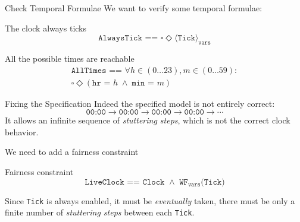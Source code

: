 \begin{frame}{Check Temporal Formulae}
    We want to verify some temporal formulae:
    \pause
    \begin{block}{The clock always ticks}
        \[
            \texttt{AlwaysTick == } \square \Diamond \langle \texttt{Tick} \rangle _{\texttt{vars}}
        \]
    \end{block}
    \pause
    \begin{block}{All the possible times are reachable}
        \begin{equation*}
            \begin{gathered}
                \texttt{AllTimes == } \forall h \in (0 \ldots 23), m \in (0 \ldots 59):\\
                \square \Diamond (\texttt{hr = } h\; \land\; \texttt{min = } m)
            \end{gathered}
        \end{equation*}
    \end{block}
    \demo
\end{frame}

\begin{frame}{Fixing the Specification}
    Indeed the specified model is not entirely correct:
    \[
        \texttt{00:00} \rightarrow \texttt{00:00} \rightarrow \texttt{00:00} \rightarrow \texttt{00:00} \rightarrow \cdots
    \]
    It allows an infinite sequence of \emph{stuttering steps}, which is not the correct clock behavior.

    \pause
    We need to add a fairness constraint
    \begin{block}{Fairness constraint}
        \[
            \texttt{LiveClock == Clock } \land \texttt{ WF}_{\texttt{vars}}\texttt{(Tick)}
        \]

        Since \texttt{Tick} is always enabled, it must be \emph{eventually} taken, there must be only a finite number of \emph{stuttering steps} between each \texttt{Tick}.
    \end{block}
    \demo
\end{frame}
